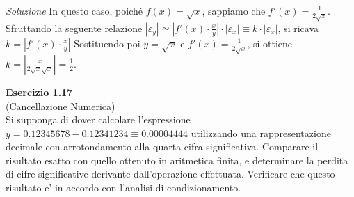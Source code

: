 \documentclass[20pt,a4paper]{book}
\begin{document}
\textit{Soluzione} 
In questo caso, poich\'e \begin{math}{f(x)=\sqrt{x}}\end{math}, sappiamo che \begin{math}{f'(x)=\frac{1}{2\sqrt{x}}}\end{math}.
Sfruttando la seguente relazione \begin{math}{|\varepsilon_{y}|\simeq|f'(x)\cdot\frac{x}{y}|\cdot|\varepsilon_{x}|\equiv k\cdot|\varepsilon_{x}|}\end{math}, si ricava  \begin{math}{k=|f'(x)\cdot\frac{x}{y}|}\end{math}
Sostituendo poi \begin{math}{y=\sqrt{x}}\end{math} e \begin{math}{f'(x)=\frac{1}{2\sqrt{x}}}\end{math}, si ottiene \begin{math}{k=|\frac{x}{2\sqrt{x}\sqrt{x}}|=\frac{1}{2}}\end{math}.

\vspace{10mm}

\textbf{\Large{Esercizio 1.17}}
\\(Cancellazione Numerica) \\Si supponga di dover calcolare l'espressione \begin{math}{y=0.12345678-0.12341234\equiv0.00004444}\end{math} utilizzando una rappresentazione decimale con arrotondamento alla quarta cifra significativa. Comparare il risultato esatto con quello ottenuto in aritmetica finita, e determinare la perdita di cifre significative derivante dall'operazione effettuata. Verificare che questo risultato e' in accordo con l'analisi di condizionamento.
\end{document}
